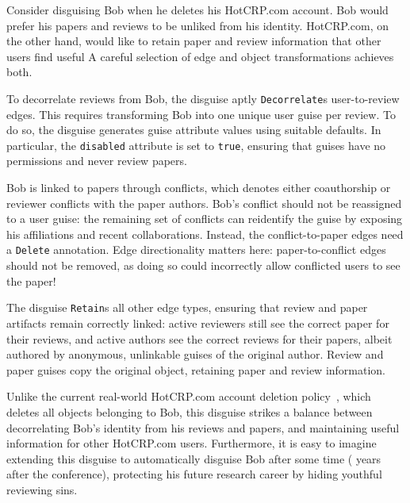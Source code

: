 Consider disguising Bob when he deletes his HotCRP.com account.
%
Bob would prefer his papers and reviews to be unliked from his identity.
%
HotCRP.com, on the other hand, would like to retain paper and review information that other users
find useful
%
A careful selection of edge and object transformations achieves both.

To decorrelate reviews from Bob, the disguise aptly \texttt{Decorrelate}s user-to-review edges.
This requires transforming Bob into one unique user guise per review.
%
To do so, the disguise generates guise attribute values using suitable defaults. In particular, the
\texttt{disabled} attribute is set to \texttt{true}, ensuring that guises have no permissions and
never review papers.
%

%
Bob is linked to papers through conflicts, which denotes either coauthorship or reviewer conflicts
with the paper authors.
%
Bob's conflict should not be reassigned to a user guise: the remaining set
of conflicts can reidentify the guise by exposing his affiliations and recent collaborations.
%
Instead, the conflict-to-paper edges need a \texttt{Delete} annotation.
%
Edge directionality matters here: paper-to-conflict edges should not be removed, as doing so
could incorrectly allow conflicted users to see the paper!

The disguise \texttt{Retain}s all other edge types, ensuring that review and paper
artifacts remain correctly linked: active reviewers still see the correct paper for their
reviews, and active authors see the correct reviews for their papers, albeit authored by
anonymous, unlinkable guises of the original author.
%
Review and paper guises copy the original object, retaining paper and review information.
%

%
Unlike the current real-world HotCRP.com account deletion policy~\cite{hotcrp:privacy}, which
deletes all objects belonging to Bob, this disguise strikes a balance between decorrelating
Bob's identity from his reviews and papers, and maintaining useful information for other
HotCRP.com users.
%
Furthermore, it is easy to imagine extending this disguise to automatically disguise Bob
after some time ( years after the conference), protecting his future research career
by hiding youthful reviewing sins.
%


